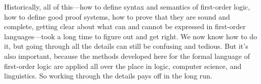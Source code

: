 \documentclass[../../../include/open-logic-section]{subfiles}
\begin{document}
Historically, all of this---how to define syntax and semantics of
first-order logic, how to define good proof systems, how to prove that
they are sound and complete, getting clear about what can and cannot
be expressed in first-order languages---took a long time to figure out
and get right.  We now know how to do it, but going through all the
details can still be confusing and tedious.  But it's also important,
because the methods developed here for the formal language of
first-order logic are applied all over the place in logic, computer
science, and linguistics. So working through the details pays off in
the long run.
\end{document}
